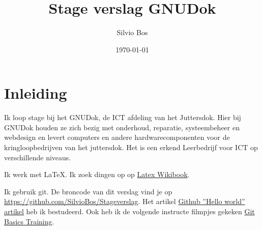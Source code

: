 \documentclass[12pt,a4paper]{article}
\begin{document}
\title{Stage verslag GNUDok}
\author{Silvio Bos}
\date{\today}
\maketitle
\section{Inleiding}
Ik loop stage bij het GNUDok, de ICT afdeling van het Juttersdok.
Hier bij GNUDok houden ze zich bezig met onderhoud, reparatie, systeembeheer en webdesign en levert computers en andere 
hardwarecomponenten voor de kringloopbedrijven van het juttersdok. 
Het is een erkend Leerbedrijf voor ICT op verschillende niveaus.


Ik werk met \LaTeX{}.  Ik zoek dingen op op \href{https://en.wikibooks.org/wiki/LaTeX}{Latex Wikibook}.

Ik gebruik git.  De broncode van dit verslag vind je op \url{https://github.com/SilvioBos/Stageverslag}. Het artikel \href{https://guides.github.com/activities/hello-world/}{Github ''Hello world'' artikel} heb ik bestudeerd.  Ook heb ik de volgende instructe filmpjes gekeken \href{https://www.youtube.com/watch?v=8oRjP8yj2Wo&list=PLg7s6cbtAD165JTRsXh8ofwRw0PqUnkVH}{Git Basics Training}.
\end{document}
